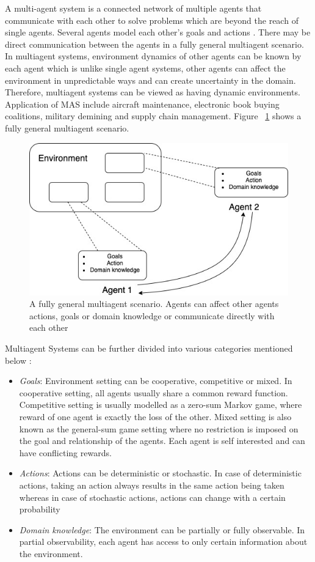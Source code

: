 \documentclass[12pt]{report}
\begin{document}
A multi-agent system is a connected network of multiple agents that communicate with each other to solve problems which are beyond the reach of single agents. Several agents model each other's goals and actions \cite{Stone}. There may be direct communication between the agents in a fully general multiagent scenario. In multiagent systems, environment dynamics of other agents can be known by each agent which is unlike single agent systems, other agents can affect the environment in unpredictable ways and can create uncertainty in the domain. Therefore, multiagent systems can be viewed as having dynamic environments. Application of MAS include aircraft maintenance, electronic book buying coalitions, military demining and supply chain management. Figure ~\ref{fig:MultiAgentSystem} shows a fully general multiagent scenario. 

\begin{figure}[!h]
    \centering
    \includegraphics[width=12cm]{MultiAgentScenario.jpg}
    \caption{A fully general multiagent scenario. Agents can affect other agents actions, goals or domain knowledge or communicate directly with each other \cite{Stone}}
    \label{fig:MultiAgentSystem}
\end{figure}


Multiagent Systems can be further divided into various categories mentioned below \cite{SurveyandArticle}:

\begin{itemize}
    \item \emph{Goals}: Environment setting can be cooperative, competitive or mixed. In cooperative setting, all agents usually share a common reward function. Competitive setting is usually modelled as a zero-sum Markov game, where reward of one agent is exactly the loss of the other. Mixed setting is also known as the general-sum game setting where no restriction is imposed on the goal and relationship of the agents. Each agent is self interested and can have conflicting rewards.
    \item \emph{Actions}: Actions can be deterministic or stochastic. In case of deterministic actions, taking an action always results in the same action being taken whereas in case of stochastic actions, actions can change with a certain probability
    \item \emph{Domain knowledge}: The environment can be partially or fully observable. In partial observability, each agent has access to only certain information about the environment. 
\end{itemize}
\end{document}
